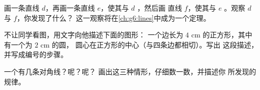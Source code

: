 \begin{exercise}[$\star\star$]\label{exo:g4:geometry:9}
画一条直线 $d$，再画一条直线 $e$，使其与 $d$ ，然后画
直线 $f$，使其与 $e$ 。观察 $d$ 与 $f$，你发现了什么？
这一观察将在\cref{ch:g6:lines}中成为一个定理。
\end{exercise}

\begin{exercise}[$\star\star$]\label{exo:g4:geometry:10}
不让同学看图，用文字向他描述下面的图形：
一个边长为 $4$ cm 的正方形，其中有一个为 $2$ cm 的圆，
圆心在正方形的中心（与四条边都相切）。写出
这段描述，并写成编号的步骤。
\end{exercise}

\begin{exercise}[$\star\star$]\label{exo:g4:geometry:11}
一个有几条对角线？呢？呢？
画出这三种情形，仔细数一数，并描述你
所发现的规律。
\end{exercise}
